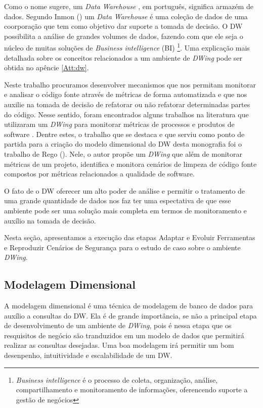 Como o nome sugere, um \emph{Data Warehouse} , em português, significa armazém de dados. Segundo Inmon (\citeyear{inmon2002}) um \emph{Data Warehouse} é uma coleção de dados de uma coorporação que tem como objetivo dar suporte a tomada de decisão. 
%
O DW possibilita a análise de grandes volumes de dados, fazendo com que ele seja o núcleo de muitas soluções de \emph{Business intelligence} (BI)
%
\footnote{\emph{Business intelligence} é o processo de coleta, organização, análise, compartilhamento e monitoramento de informações, oferencendo suporte a gestão de negócios}. 
%
Uma explicação mais detalhada sobre os  conceitos relacionados a um ambiente de \emph{DWing} pode ser obtida no  apêncie \ref{Att:dw}.

Neste trabalho procuramos desenvolver mecanismos que nos permitam monitorar e analisar o código fonte através de métricas de forma automatizada e que nos auxilie na tomada de decisão de refatorar ou não refatorar determinadas partes do código. 
%
Nesse sentido, foram encontrados alguns trabalhos na literatura que utilizaram um \emph{DWing} para monitorar métricas de processos e produtos de software \cite{Folleco2007} \cite{Silveira2010}\cite{mazuco2011} \cite{rego2014}. Dentre estes, o trabalho que se destaca e que serviu como ponto de partida para a criação do modelo dimensional do DW desta monografia foi o trabalho de Rego (\citeyear{rego2014}). Nele, o autor propõe um \emph{DWing} que além de monitorar métricas de um projeto,  identifica e monitora cenários de limpeza de código fonte compostos por métricas relacionados a qualidade de software.

% 
O fato de o DW oferecer um alto poder de análise e permitir o tratamento de uma grande quantidade de dados nos faz ter uma espectativa de que esse ambiente pode ser uma solução mais completa em termos de monitoramento e auxílio na tomada de decisão. 

Nesta seção, apresentamos a execução das etapas Adaptar e Evoluir Ferramentas e Reproduzir Cenários de Segurança para o estudo de caso sobre o ambiente \emph{DWing}.

\subsection{Modelagem Dimensional}

A modelagem dimensional é uma técnica de modelagem de banco de dados para auxílio a consultas do DW. Ela é de grande importância, se não a principal etapa de desenvolvimento de um ambiente de \emph{DWing}, pois é nessa etapa que os resquisitos de negócio são tranduzidos em um modelo de dados que permitirá realizar as consultas desejadas. Uma boa modelagem irá permitir um bom desenpenho, intuitividade e escalabilidade de um DW.

